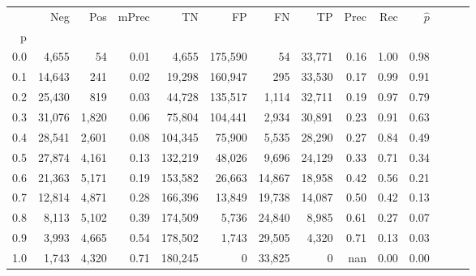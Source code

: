 \begin{tabular}{rrrrrrrrrrrrrr}
\toprule
{} &     Neg &    Pos & mPrec &       TN &       FP &      FN &      TP &  Prec &   Rec & $\hat{p}$ \\
p   &         &        &       &          &          &         &         &       &       &           \\
\midrule
0.0 &   4,655 &     54 &  0.01 &    4,655 &  175,590 &      54 &  33,771 &  0.16 &  1.00 &      0.98 \\
0.1 &  14,643 &    241 &  0.02 &   19,298 &  160,947 &     295 &  33,530 &  0.17 &  0.99 &      0.91 \\
0.2 &  25,430 &    819 &  0.03 &   44,728 &  135,517 &   1,114 &  32,711 &  0.19 &  0.97 &      0.79 \\
0.3 &  31,076 &  1,820 &  0.06 &   75,804 &  104,441 &   2,934 &  30,891 &  0.23 &  0.91 &      0.63 \\
0.4 &  28,541 &  2,601 &  0.08 &  104,345 &   75,900 &   5,535 &  28,290 &  0.27 &  0.84 &      0.49 \\
0.5 &  27,874 &  4,161 &  0.13 &  132,219 &   48,026 &   9,696 &  24,129 &  0.33 &  0.71 &      0.34 \\
0.6 &  21,363 &  5,171 &  0.19 &  153,582 &   26,663 &  14,867 &  18,958 &  0.42 &  0.56 &      0.21 \\
0.7 &  12,814 &  4,871 &  0.28 &  166,396 &   13,849 &  19,738 &  14,087 &  0.50 &  0.42 &      0.13 \\
0.8 &   8,113 &  5,102 &  0.39 &  174,509 &    5,736 &  24,840 &   8,985 &  0.61 &  0.27 &      0.07 \\
0.9 &   3,993 &  4,665 &  0.54 &  178,502 &    1,743 &  29,505 &   4,320 &  0.71 &  0.13 &      0.03 \\
1.0 &   1,743 &  4,320 &  0.71 &  180,245 &        0 &  33,825 &       0 &   nan &  0.00 &      0.00 \\
\bottomrule
\end{tabular}
